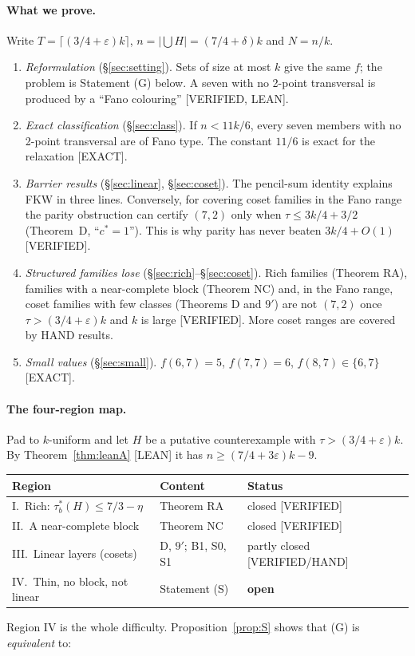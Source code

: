 \documentclass[11pt]{article}
\theoremstyle{definition}
\newcommand{\st}[1]{\textsf{\small[#1]}}
\begin{document}
\paragraph{What we prove.} Write $T=\lceil(3/4+\varepsilon)k\rceil$, $n=|\bigcup H|=(7/4+\delta)k$ and $N=n/k$.
\begin{enumerate}[leftmargin=*]
\item \emph{Reformulation} (\S\ref{sec:setting}). Sets of size at most $k$ give the same $f$; the problem is
Statement (G) below. A seven with no 2-point transversal is produced by a ``Fano colouring'' \st{VERIFIED, LEAN}.
\item \emph{Exact classification} (\S\ref{sec:class}). If $n<11k/6$, every seven members with no 2-point
transversal are of Fano type. The constant $11/6$ is exact for the relaxation \st{EXACT}.
\item \emph{Barrier results} (\S\ref{sec:linear}, \S\ref{sec:coset}). The pencil-sum identity explains FKW in three
lines. Conversely, for covering coset families in the Fano range the parity obstruction can certify $(7,2)$ only when
$\tau\le 3k/4+3/2$ (Theorem~D, ``$c^*=1$''). This is why parity has never beaten $3k/4+O(1)$ \st{VERIFIED}.
\item \emph{Structured families lose} (\S\ref{sec:rich}--\S\ref{sec:coset}). Rich families (Theorem RA), families
with a near-complete block (Theorem NC) and, in the Fano range, coset families with few classes (Theorems D and
$9'$) are not $(7,2)$ once $\tau>(3/4+\varepsilon)k$ and $k$ is large \st{VERIFIED}. More coset ranges are covered by HAND results.
\item \emph{Small values} (\S\ref{sec:small}). $f(6,7)=5$, $f(7,7)=6$, $f(8,7)\in\{6,7\}$ \st{EXACT}.
\end{enumerate}

\paragraph{The four-region map.} Pad to $k$-uniform and let $H$ be a putative counterexample with
$\tau>(3/4+\varepsilon)k$. By Theorem~\ref{thm:leanA} \st{LEAN} it has $n\ge(7/4+3\varepsilon)k-9$.
\begin{center}
\begin{tabular}{@{}lll@{}}
\toprule
Region & Content & Status\\
\midrule
I.\ Rich: $\tau^*_b(H)\le 7/3-\eta$ & Theorem RA & closed \st{VERIFIED}\\
II.\ A near-complete block & Theorem NC & closed \st{VERIFIED}\\
III.\ Linear layers (cosets) & D, $9'$; B1, S0, S1 & partly closed \st{VERIFIED/HAND}\\
IV.\ Thin, no block, not linear & Statement (S) & \textbf{open}\\
\bottomrule
\end{tabular}
\end{center}
Region IV is the whole difficulty. Proposition~\ref{prop:S} shows that (G) is \emph{equivalent} to:
\end{document}
